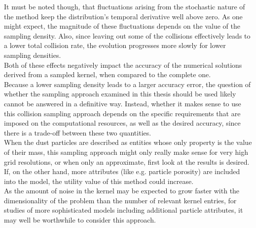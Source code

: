 It must be noted though, 
that fluctuations arising from the stochastic nature of the method keep the distribution's temporal 
derivative well above zero. As one might expect, the magnitude of these fluctuations depends on the 
value of the sampling density. 
Also, since leaving out some of the collisions effectively leads to a 
lower total collision rate, the evolution progresses more slowly for lower sampling densities. \\

Both of these effects negatively impact the accuracy of the numerical solutions derived from a 
sampled kernel, when compared to the complete one. \\

Because a lower sampling density leads to a larger accuracy error, the question of whether the
sampling approach examined in this thesis should be used likely cannot be answered in a definitive 
way.
Instead, whether it makes sense to use this collision sampling approach depends on the specific 
requirements that are imposed on the computational resources, as well as the desired accuracy, 
since there is a trade-off between these two quantities. \\

When the dust particles are described as entities whose only 
property is the value of their mass, this sampling approach might only really make sense for very 
high grid resolutions, or when only an approximate, first look at the results is desired. \\

If, on the other hand, more attributes (like e.g. particle porosity) are included into the model, 
the utility value of this method could increase. \\

As the amount of noise in the kernel may be expected to grow faster with the dimensionality of the 
problem than the number of relevant kernel entries, for studies of more sophisticated models
including additional particle attributes, it may well be worthwhile to consider this approach.

